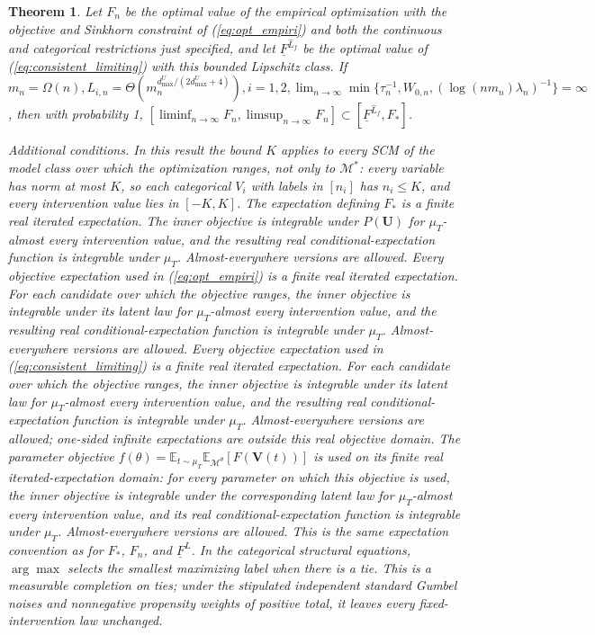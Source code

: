 \documentclass[12pt]{article}
\theoremstyle{plain}
\newtheorem{theorem}{Theorem}[section]
\theoremstyle{definition}
\theoremstyle{remark}
\begin{document}
\begin{theorem}
Let $F_n$ be the optimal value of the empirical optimization with the objective and Sinkhorn constraint of (\ref{eq:opt_empiri}) and both the continuous and categorical restrictions just specified, and let $\underline F^{\hat L_f}$ be the optimal value of (\ref{eq:consistent_limiting}) with this bounded Lipschitz class.  
 If $ m_n = \Omega(n), L_{i,n} = \Theta(m_{n}^{d_{\max}^{U} /\left( 2d_{\max}^{U} +4\right)}), i=1,2, \lim _{n\rightarrow \infty }\min\{\tau_n^{-1}, W_{0,n},(\log(nm_n)\lambda_n)^{-1}\}= \infty$ , then with probability 1,  $ [\liminf _{n\rightarrow \infty } F_{n},\limsup _{n\rightarrow \infty } F_{n}] \subset [\underline{F}^{\hat{L}_f} ,F_{*}]$.

\emph{Additional conditions.} In this result the bound $K$ applies to every SCM of the model class over which the optimization ranges, not only to $\mathcal M^*$: every variable has norm at most $K$, so each categorical $V_i$ with labels in $[n_i]$ has $n_i\leq K$, and every intervention value lies in $[-K,K]$. The expectation defining $F_*$ is a finite real iterated expectation. The inner objective is integrable under $P(\boldsymbol U)$ for $\mu_T$-almost every intervention value, and the resulting real conditional-expectation function is integrable under $\mu_T$. Almost-everywhere versions are allowed. Every objective expectation used in (\ref{eq:opt_empiri}) is a finite real iterated expectation. For each candidate over which the objective ranges, the inner objective is integrable under its latent law for $\mu_T$-almost every intervention value, and the resulting real conditional-expectation function is integrable under $\mu_T$. Almost-everywhere versions are allowed. Every objective expectation used in (\ref{eq:consistent_limiting}) is a finite real iterated expectation. For each candidate over which the objective ranges, the inner objective is integrable under its latent law for $\mu_T$-almost every intervention value, and the resulting real conditional-expectation function is integrable under $\mu_T$. Almost-everywhere versions are allowed; one-sided infinite expectations are outside this real objective domain. The parameter objective $f(\theta)=\mathbb E_{t\sim\mu_T}\mathbb E_{\mathcal M^\theta}[F(\boldsymbol V(t))]$ is used on its finite real iterated-expectation domain: for every parameter on which this objective is used, the inner objective is integrable under the corresponding latent law for $\mu_T$-almost every intervention value, and its real conditional-expectation function is integrable under $\mu_T$. Almost-everywhere versions are allowed. This is the same expectation convention as for $F_*$, $F_n$, and $\underline F^L$. In the categorical structural equations, $\arg\max$ selects the smallest maximizing label when there is a tie. This is a measurable completion on ties; under the stipulated independent standard Gumbel noises and nonnegative propensity weights of positive total, it leaves every fixed-intervention law unchanged.
\end{theorem}
\end{document}
